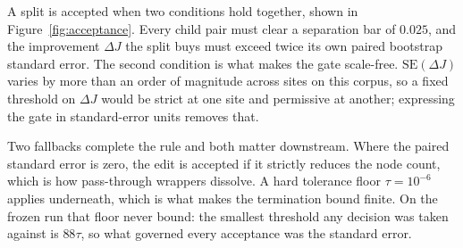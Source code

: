 A split is accepted when two conditions hold together, shown in
Figure~\ref{fig:acceptance}. Every child pair must clear a separation
bar of $0.025$, and the improvement $\Delta J$ the split buys must
exceed twice its own paired bootstrap standard error. The second
condition is what makes the gate scale-free. $\mathrm{SE}(\Delta J)$
varies by more than an order of magnitude across sites on this corpus,
so a fixed threshold on $\Delta J$ would be strict at one site and
permissive at another; expressing the gate in standard-error units
removes that.

Two fallbacks complete the rule and both matter downstream. Where the
paired standard error is zero, the edit is accepted if it strictly
reduces the node count, which is how pass-through wrappers dissolve. A
hard tolerance floor $\tau = 10^{-6}$ applies underneath, which is what
makes the termination bound finite. On the frozen run that floor never
bound: the smallest threshold any decision was taken against is
$88\tau$, so what governed every acceptance was the standard error.

